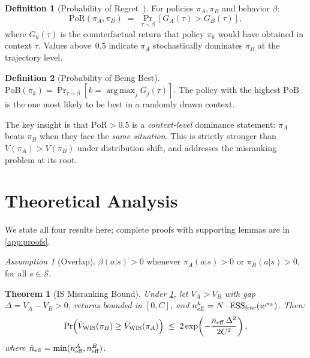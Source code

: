 \documentclass[10pt]{article}
\theoremstyle{plain}
\newtheorem{theorem}{Theorem}
\theoremstyle{definition}
\newtheorem{definition}{Definition}
\theoremstyle{remark}
\newtheorem{assumption}{Assumption}
\newcommand{\PoR}{\mathrm{PoR}}
\newcommand{\PoB}{\mathrm{PoB}}
\newcommand{\ESS}{\mathrm{ESS}}
\newcommand{\neff}{n_{\mathrm{eff}}}
\newcommand{\piA}{\pi_A}
\newcommand{\piB}{\pi_B}
\newcommand{\GA}{G_A}
\newcommand{\GB}{G_B}
\newcommand{\calS}{\mathcal{S}}
\DeclareMathOperator*{\argmax}{arg\,max}
\begin{document}
\begin{definition}[Probability of Regret~\citep{kawakami2025potential}]
  \label{def:por}
  For policies $\piA,\piB$ and behavior $\beta$:
  \begin{equation}
    \PoR(\piA,\piB) \;=\; \Pr_{\tau\sim\beta}\!\left[\GA(\tau) > \GB(\tau)\right],
    \label{eq:por_def}
  \end{equation}
  where $G_k(\tau)$ is the counterfactual return that policy $\pi_k$ would
  have obtained in context $\tau$.
  Values above~0.5 indicate $\piA$ stochastically dominates $\piB$
  at the trajectory level.
\end{definition}

\begin{definition}[Probability of Being Best]
  $\PoB(\pi_k)=\Pr_{\tau\sim\beta}[k=\argmax_j G_j(\tau)]$.
  The policy with the highest $\PoB$ is the one most likely to be best in
  a randomly drawn context.
\end{definition}

\noindent
The key insight is that $\PoR>0.5$ is a \emph{context-level} dominance
statement: $\piA$ beats $\piB$ when they face the \emph{same situation}.
This is strictly stronger than $V(\piA)>V(\piB)$ under distribution shift, and
addresses the misranking problem at its root.

\section{Theoretical Analysis}
\label{sec:theory}

We state all four results here; complete proofs with supporting lemmas are in
\cref{app:proofs}.

\begin{assumption}[Overlap]
  \label{assum:overlap}
  $\beta(a|s)>0$ whenever $\piA(a|s)>0$ or $\piB(a|s)>0$, for all $s\in\calS$.
\end{assumption}

\begin{theorem}[IS Misranking Bound]
  \label{thm:is}
  Under \cref{assum:overlap}, let $V_A>V_B$ with gap $\Delta=V_A-V_B>0$,
  returns bounded in $[0,C]$, and $\neff^k=N\cdot\ESS_{\rm frac}(w^{\pi_k})$.
  Then:
  \begin{equation}
    \Pr\!\left(\hat{V}_{\rm WIS}(\piB) \geq \hat{V}_{\rm WIS}(\piA)\right)
    \;\leq\; 2\exp\!\left(-\frac{\bar{n}_{\rm eff}\,\Delta^2}{2C^2}\right),
    \label{eq:is_bound}
  \end{equation}
  where $\bar{n}_{\rm eff}=\min(\neff^A,\neff^B)$.
\end{theorem}
\end{document}
